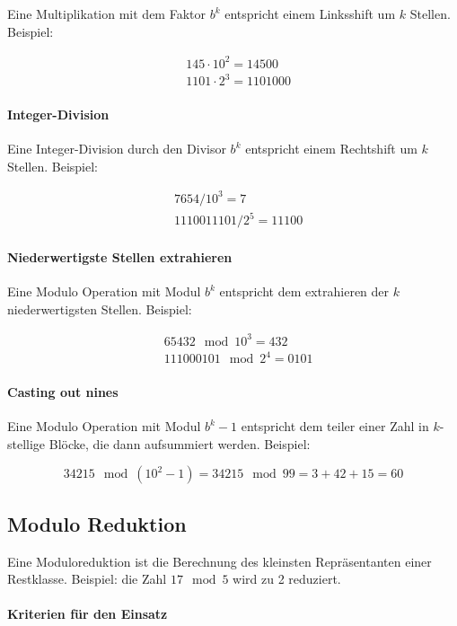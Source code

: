 Eine Multiplikation mit dem Faktor $b^k$ entspricht einem Linksshift um $k$ Stellen. Beispiel:

\begin{align*}
    & 145 \cdot 10^2 = 14500 \\
    & 1101 \cdot 2^3 = 1101000
\end{align*}

\paragraph{Integer-Division}

Eine Integer-Division durch den Divisor $b^k$ entspricht einem Rechtshift um $k$ Stellen. Beispiel:

\begin{align*}
    & 7654 / 10^3 = 7 \\
    & 1110011101 / 2^5 = 11100
\end{align*}

\paragraph{Niederwertigste Stellen extrahieren}

Eine Modulo Operation mit Modul $b^k$ entspricht dem extrahieren der $k$ niederwertigsten Stellen. Beispiel:

\begin{align*}
    & 65432 \mod 10^3 = 432 \\
    & 111000101 \mod 2^4 = 0101
\end{align*}

\paragraph{Casting out nines}

Eine Modulo Operation mit Modul $b^k - 1$ entspricht dem teiler einer Zahl in $k$-stellige Blöcke, die dann aufsummiert werden. Beispiel:

$$34215 \mod (10^2 - 1) = 34215 \mod 99 = 3 + 42 + 15 = 60$$

\subsection{Modulo Reduktion}

Eine Moduloreduktion ist die Berechnung des kleinsten Repräsentanten einer Restklasse. Beispiel: die Zahl $17 \mod 5$ wird zu 2 reduziert.

\paragraph{Kriterien für den Einsatz}

